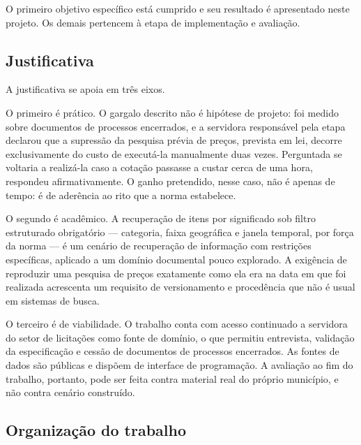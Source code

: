 O primeiro objetivo específico está cumprido e seu resultado é apresentado neste
projeto. Os demais pertencem à etapa de implementação e avaliação.


\subsection{Justificativa}

A justificativa se apoia em três eixos.

O primeiro é prático. O gargalo descrito não é hipótese de projeto: foi medido
sobre documentos de processos encerrados, e a servidora responsável pela etapa
declarou que a supressão da pesquisa prévia de preços, prevista em lei, decorre
exclusivamente do custo de executá-la manualmente duas vezes. Perguntada se
voltaria a realizá-la caso a cotação passasse a custar cerca de uma hora,
respondeu afirmativamente. O ganho pretendido, nesse caso, não é apenas de tempo:
é de aderência ao rito que a norma estabelece.

O segundo é acadêmico. A recuperação de itens por significado sob filtro
estruturado obrigatório --- categoria, faixa geográfica e janela temporal, por
força da norma --- é um cenário de recuperação de informação com restrições
específicas, aplicado a um domínio documental pouco explorado. A exigência de
reproduzir uma pesquisa de preços exatamente como ela era na data em que foi
realizada acrescenta um requisito de versionamento e procedência que não é usual
em sistemas de busca.


O terceiro é de viabilidade. O trabalho conta com acesso continuado a servidora
do setor de licitações como fonte de domínio, o que permitiu entrevista,
validação da especificação e cessão de documentos de processos encerrados. As
fontes de dados são públicas e dispõem de interface de programação. A avaliação
ao fim do trabalho, portanto, pode ser feita contra material real do próprio
município, e não contra cenário construído.

\subsection{Organização do trabalho}

